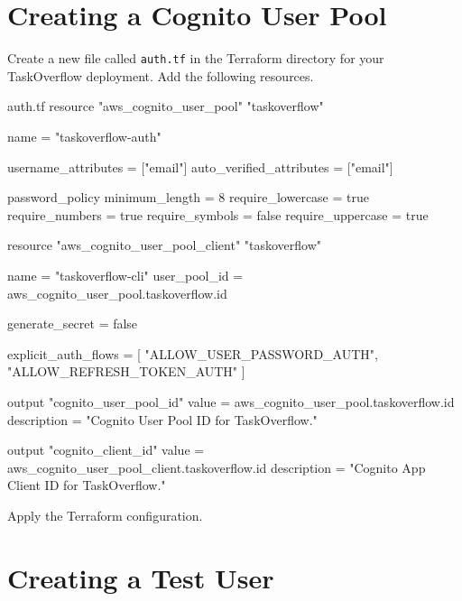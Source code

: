 \documentclass{csse4400}
\begin{document}

\section{Creating a Cognito User Pool}

Create a new file called \texttt{auth.tf} in the Terraform directory for your TaskOverflow deployment.
Add the following resources.

\begin{code}[language=terraform,numbers=none]{auth.tf}
resource "aws_cognito_user_pool" "taskoverflow" {
  name = "taskoverflow-auth"

  username_attributes      = ["email"]
  auto_verified_attributes = ["email"]

  password_policy {
    minimum_length    = 8
    require_lowercase = true
    require_numbers   = true
    require_symbols   = false
    require_uppercase = true
  }
}

resource "aws_cognito_user_pool_client" "taskoverflow" {
  name         = "taskoverflow-cli"
  user_pool_id = aws_cognito_user_pool.taskoverflow.id

  generate_secret = false

  explicit_auth_flows = [
    "ALLOW_USER_PASSWORD_AUTH",
    "ALLOW_REFRESH_TOKEN_AUTH"
  ]
}

output "cognito_user_pool_id" {
  value       = aws_cognito_user_pool.taskoverflow.id
  description = "Cognito User Pool ID for TaskOverflow."
}

output "cognito_client_id" {
  value       = aws_cognito_user_pool_client.taskoverflow.id
  description = "Cognito App Client ID for TaskOverflow."
}
\end{code}

Apply the Terraform configuration.



\section{Creating a Test User}
\end{document}
